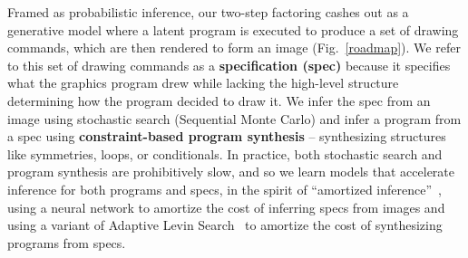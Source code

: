 \documentclass{article}
\theoremstyle{definition}
\begin{document}
 Framed as probabilistic inference,
 our two-step factoring cashes out as a generative model where a latent program
 is executed to produce a set of drawing commands,
 which are then rendered to form an image (Fig.~\ref{roadmap}).
 We refer to this set of drawing commands as a \textbf{specification (spec)} because it specifies what the graphics program drew while lacking the high-level structure determining how the program decided to draw it.
 We infer the spec from an image using stochastic search (Sequential Monte Carlo)
 and infer a program from a spec using  \textbf{constraint-based program synthesis} \citep{solar2008program} --
 synthesizing structures like symmetries, loops, or conditionals.
 In practice, both stochastic search and program synthesis are
 prohibitively slow,
 and so we learn models that accelerate inference for both programs and specs,
 in the spirit of ``amortized inference''~\cite{paige2016inference},
 using a neural network to amortize the cost of inferring specs from images and using
 a variant of Adaptive Levin Search~\cite{schmidhuber1997shifting}
 to amortize the cost of synthesizing programs from specs.
\end{document}
